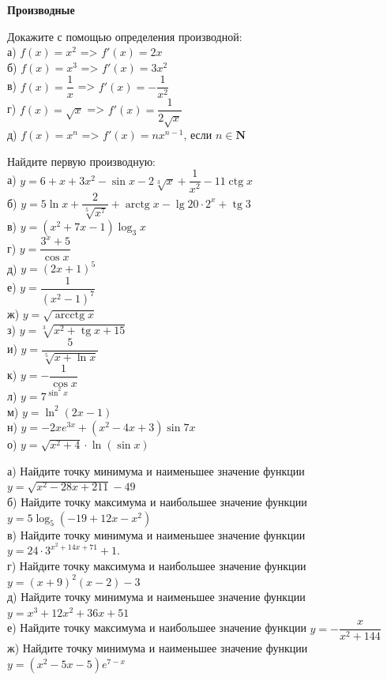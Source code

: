 \centerline{\bf \Huge Производные}

 Докажите с помощью определения производной:\\
а) $f(x)=x^2$ => $f'(x)=2x$\\
б) $f(x)=x^3$ => $f'(x)=3x^2$\\
в) $f(x)=\dfrac{1}{x}$ => $f'(x)=-\dfrac{1}{x^2}$\\
г) $f(x)=\sqrt{x}$ => $f'(x)=\dfrac{1}{2\sqrt{x}}$\\
д) $f(x)=x^n$ => $f'(x)=nx^{n-1}$, если $n \in \boldsymbol{N}$

 Найдите первую производную:\\
а) $y=6+x+3 x^2-\sin x-2 \sqrt[3]{x}+\dfrac{1}{x^2}-11 \operatorname{ctg} x$\\
б) $y=5 \ln x+\dfrac{2}{\sqrt[5]{x^7}}+\operatorname{arctg} x-\lg 20 \cdot 2^x+\operatorname{tg} 3$\\
в) $y=\left(x^2+7 x-1\right) \log _3 x$\\
г) $y=\dfrac{3^x+5}{\cos x}$\\
д) $y=(2 x+1)^5$\\
е) $y=\dfrac{1}{\left(x^2-1\right)^7}$\\
ж) $y=\sqrt{\operatorname{arcctg} x}$\\
з) $y=\sqrt[3]{x^2+\operatorname{tg} x+15}$\\
и) $y=\dfrac{5}{\sqrt[5]{x+\ln x}}$\\
к) $y=-\dfrac{1}{\cos x}$\\
л) $y=7^{\sin ^2 x}$\\
м) $y=\ln ^2(2 x-1)$\\
н) $y=-2 x e^{3 x}+\left(x^2-4 x+3\right) \sin 7 x$\\
о) $y=\sqrt{x^2+4} \cdot \ln (\sin x)$

 а) Найдите точку минимума и наименьшее значение функции $y=\sqrt{x^2-28 x+211}-49$\\
б) Найдите точку максимума и наибольшее значение функции $y=5\log _5\left(-19+12 x-x^2\right)$\\
в) Найдите точку минимума и наименьшее значение функции $y=24\cdot3^{x^2+14 x+71}+1$.\\
г) Найдите точку максимума и наибольшее значение функции $y=(x+9)^2(x-2)-3$\\
д) Найдите точку минимума и наименьшее значение функции $y=x^3+12 x^2+36 x+51$\\
е) Найдите точку максимума и наибольшее значение функции $y=-\dfrac{x}{x^2+144}$\\
ж) Найдите точку минимума и наименьшее значение функции $y=\left(x^2-5 x-5\right) e^{7-x}$

